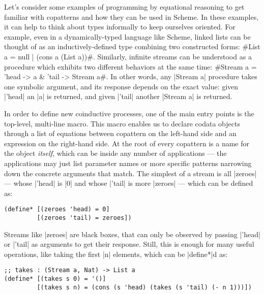 Let's consider some examples of programming by equational reasoning to get familiar with copatterns and how they can be used in Scheme.
In these examples, it can help to think about types informally to keep ourselves oriented.
For example, even in a dynamically-typed language like Scheme, linked lists can be thought of as an inductively-defined type combining two constructed forms: \scm#List a = null | (cons a (List a))#.
Similarly, infinite streams can be understood as a procedure which exhibits two different behaviors at the same time: \scm#Stream a = 'head -> a & 'tail -> Stream a#.
In other words, any \scm|Stream a| procedure takes one symbolic argument, and its response depends on the exact value: given \scm|'head| an \scm|a| is returned, and given \scm|'tail| another \scm|Stream a| is returned.

In order to define new coinductive processes, one of the main entry points is the top-level, multi-line macro.
This macro enables us to declare codata objects through a list of equations between copattern on the left-hand side and an expression on the right-hand side.
At the root of every copattern is a name for the object \emph{itself}, which can be inside any number of applications --- the applications may just list parameter names or more specific patterns narrowing down the concrete arguments that match.
The simplest of a stream is all \scm|zeroes| --- whose \scm|'head| is \scm|0| and whose \scm|'tail| is more \scm|zeroes| --- which can be defined as:
\begin{verbatim}
(define* [(zeroes 'head) = 0]
         [(zeroes 'tail) = zeroes])
\end{verbatim}
Streams like \scm|zeroes| are black boxes, that can only be observed by passing \scm|'head| or \scm|'tail| as arguments to get their response.
Still, this is enough for many useful operations, like taking the first \scm|n| elements, which can be \scm|define*|d as:
\begin{verbatim}
;; takes : (Stream a, Nat) -> List a
(define* [(takes s 0) = '()]
         [(takes s n) = (cons (s 'head) (takes (s 'tail) (- n 1)))])
\end{verbatim}
